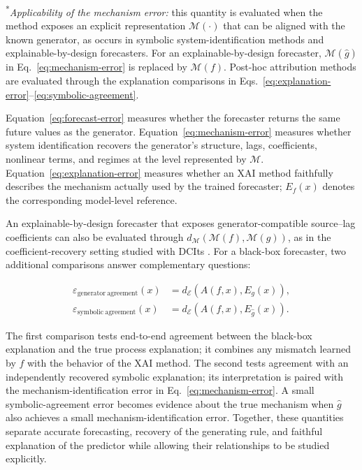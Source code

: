\noindent\textsuperscript{*}\emph{Applicability of the mechanism error:}
this quantity is evaluated when the method exposes an explicit representation
$\mathcal M(\cdot)$ that can be aligned with the known generator, as occurs in
symbolic system-identification methods and explainable-by-design forecasters.
For an explainable-by-design forecaster, $\mathcal M(\widehat g)$ in
Eq.~\ref{eq:mechanism-error} is replaced by $\mathcal M(f)$. Post-hoc
attribution methods are evaluated through the explanation comparisons in
Eqs.~\ref{eq:explanation-error}--\ref{eq:symbolic-agreement}.

Equation~\ref{eq:forecast-error} measures whether the forecaster returns the
same future values as the generator. Equation~\ref{eq:mechanism-error} measures
whether system identification recovers the generator's structure, lags,
coefficients, nonlinear terms, and regimes at the level represented by
$\mathcal M$. Equation~\ref{eq:explanation-error} measures whether an XAI
method faithfully describes the mechanism actually used by the trained
forecaster; $E_f(x)$ denotes the corresponding model-level reference.

An explainable-by-design forecaster that exposes generator-compatible
source--lag coefficients can also be evaluated through
$d_{\mathcal M}(\mathcal M(f),\mathcal M(g))$, as in the coefficient-recovery
setting studied with DCIts \citep{baric2026dcits}. For a black-box forecaster,
two additional comparisons answer complementary questions:

\begin{align}
\varepsilon_{\mathrm{generator\ agreement}}(x)
&=d_{\mathcal E}\!\left(A(f,x),E_g(x)\right),
\label{eq:generator-agreement}\\
\varepsilon_{\mathrm{symbolic\ agreement}}(x)
&=d_{\mathcal E}\!\left(A(f,x),E_{\widehat g}(x)\right).
\label{eq:symbolic-agreement}
\end{align}

The first comparison tests end-to-end agreement between the black-box
explanation and the true process explanation; it combines any mismatch learned
by $f$ with the behavior of the XAI method. The second tests agreement with an
independently recovered symbolic explanation; its interpretation is paired
with the mechanism-identification error in Eq.~\ref{eq:mechanism-error}. A
small symbolic-agreement error becomes evidence about the true mechanism when
$\widehat g$ also achieves a small mechanism-identification error. Together,
these quantities separate accurate forecasting, recovery of the generating
rule, and faithful explanation of the predictor while allowing their
relationships to be studied explicitly.

